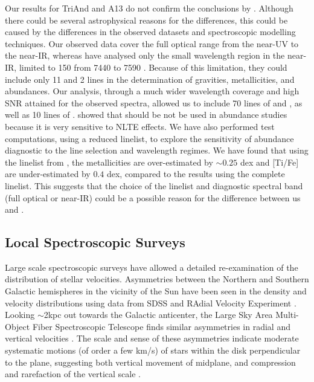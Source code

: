 \documentclass[galaxies,article,submit,moreauthors,pdftex,10pt,a4paper]{mdpi}
\begin{document}
Our results for TriAnd and A13 do not confirm the conclusions by \cite{chou2010b}. Although there could be several astrophysical reasons for the differences, this could be caused by the differences in the observed datasets and spectroscopic modelling techniques. Our observed data cover the full optical range from the near-UV to the near-IR, whereas \cite{chou2010b} have analysed only the small wavelength region in the near-IR, limited to 150 \Angstrom from 7440 to 7590 \Angstrom. Because of this limitation, they could include only 11  and 2  lines in the determination of gravities, metallicities, and abundances. Our analysis, through a much wider wavelength coverage and high SNR attained for the observed spectra, allowed us to include 70 lines of  and  \cite{bergemann2012}, as well as 10 lines of . \cite{bergemann2011} showed that  should be not be used in abundance studies because it is very sensitive to NLTE effects. We have also performed test computations, using a reduced linelist, to explore the sensitivity of abundance diagnostic to the line selection and wavelength regimes. We have found that using the linelist from \cite{chou2010a}, the metallicities are over-estimated by $\sim 0.25$ dex and [Ti/Fe] are under-estimated by $0.4$ dex, compared to the results using the complete linelist. This suggests that the choice of the linelist and diagnostic spectral band (full optical or near-IR) could be a possible reason for the difference between us and \cite{chou2010}.

\subsection{Local Spectroscopic Surveys}

Large scale spectroscopic surveys have allowed a detailed re-examination of the distribution of stellar velocities.
Asymmetries between the Northern and Southern Galactic hemispheres in the vicinity of the Sun have been seen in the density and velocity distributions using data from SDSS \citep{widrow12,yanny13} and RAdial Velocity Experiment \citep[RAVE, see][]{??,williams13}.
Looking $\sim$2kpc out towards the Galactic anticenter, the Large Sky Area Multi-Object Fiber Spectroscopic Telescope \citep[LAMOST,][]{cui12,demg12,zhao12} finds similar asymmetries in radial and vertical velocities \citep{carlin13}.
The scale and sense of these asymmetries indicate moderate systematic motions (of order a few km/s)  of stars within the disk perpendicular to the plane,   suggesting both vertical movement of midplane, and compression and rarefaction of the vertical scale \citep[referred to as ``bending'' and ``breathing'' modes respectively --- see,][]{widrow14}.
\end{document}

